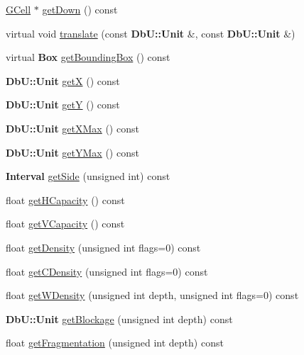 \begin{DoxyCompactItemize}
\item 
\hyperlink{classKatabatic_1_1GCell}{G\+Cell} $\ast$ \hyperlink{classKatabatic_1_1GCell_ae448c9d6d028e967d7bd5a1bfdd05311}{get\+Down} () const
\item 
virtual void \hyperlink{classKatabatic_1_1GCell_a819f3ffbba69e4de2a19c827676b5aee}{translate} (const \textbf{ Db\+U\+::\+Unit} \&, const \textbf{ Db\+U\+::\+Unit} \&)
\item 
virtual \textbf{ Box} \hyperlink{classKatabatic_1_1GCell_ab5d8bf98ab5af6fcfebea1b9f446d5d7}{get\+Bounding\+Box} () const
\item 
\textbf{ Db\+U\+::\+Unit} \hyperlink{classKatabatic_1_1GCell_a00b8f54c8171f6699e57de1b8c18eeb1}{getX} () const
\item 
\textbf{ Db\+U\+::\+Unit} \hyperlink{classKatabatic_1_1GCell_a4580de6b074712e400d5d238ce3af054}{getY} () const
\item 
\textbf{ Db\+U\+::\+Unit} \hyperlink{classKatabatic_1_1GCell_aaf7ff16cd2fd5a3fa4c5221efb9b9b76}{get\+X\+Max} () const
\item 
\textbf{ Db\+U\+::\+Unit} \hyperlink{classKatabatic_1_1GCell_a096a92c18156eac4268efb50496a2d18}{get\+Y\+Max} () const
\item 
\textbf{ Interval} \hyperlink{classKatabatic_1_1GCell_a10f3dd5001b2015e34a9aacdacf6eae6}{get\+Side} (unsigned int) const
\item 
float \hyperlink{classKatabatic_1_1GCell_ad0dda8d59162b90040263fc55d7da714}{get\+H\+Capacity} () const
\item 
float \hyperlink{classKatabatic_1_1GCell_a3994e204ebccf8aa12899e0c5ef4112b}{get\+V\+Capacity} () const
\item 
float \hyperlink{classKatabatic_1_1GCell_ad31c16c87377e164728a0df55e21f96b}{get\+Density} (unsigned int flags=0) const
\item 
float \hyperlink{classKatabatic_1_1GCell_ae56b981fad5960835faef809ec282cfa}{get\+C\+Density} (unsigned int flags=0) const
\item 
float \hyperlink{classKatabatic_1_1GCell_aa64538731e911c60eeaea557be1c7740}{get\+W\+Density} (unsigned int depth, unsigned int flags=0) const
\item 
\textbf{ Db\+U\+::\+Unit} \hyperlink{classKatabatic_1_1GCell_ab37ffda5a2e1ba60931d32c29237bd33}{get\+Blockage} (unsigned int depth) const
\item 
float \hyperlink{classKatabatic_1_1GCell_a44ec8d16030b5900bd0ccc02652b727f}{get\+Fragmentation} (unsigned int depth) const
\item 

\end{DoxyCompactItemize}
